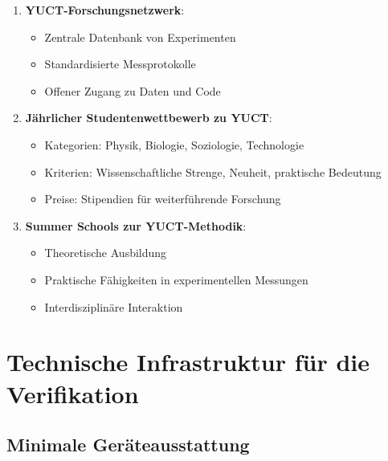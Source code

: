 \documentclass[12pt,a4paper]{article}
\begin{document}
	\begin{enumerate}
		\item \textbf{YUCT-Forschungsnetzwerk}:
		\begin{itemize}
			\item Zentrale Datenbank von Experimenten
			\item Standardisierte Messprotokolle
			\item Offener Zugang zu Daten und Code
		\end{itemize}
		
		\item \textbf{Jährlicher Studentenwettbewerb zu YUCT}:
		\begin{itemize}
			\item Kategorien: Physik, Biologie, Soziologie, Technologie
			\item Kriterien: Wissenschaftliche Strenge, Neuheit, praktische Bedeutung
			\item Preise: Stipendien für weiterführende Forschung
		\end{itemize}
		
		\item \textbf{Summer Schools zur YUCT-Methodik}:
		\begin{itemize}
			\item Theoretische Ausbildung
			\item Praktische Fähigkeiten in experimentellen Messungen
			\item Interdisziplinäre Interaktion
		\end{itemize}
	\end{enumerate}
	
	\section{Technische Infrastruktur für die Verifikation}
	
	\subsection{Minimale Geräteausstattung}
	
\end{document}
